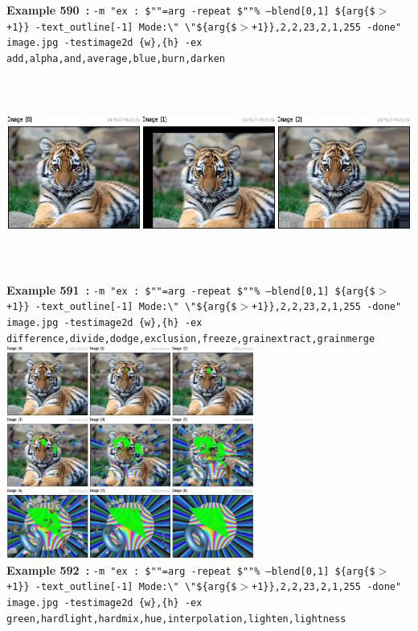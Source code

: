 \documentclass[a4paper,11pt,twoside]{book}
\begin{document}
\begin{center}
{\footnotesize \textbf{Example 590~:} \texttt{-m "ex : \$""=arg -repeat \$""\% --blend[0,1] \$\{arg\{\$$>$+1\}\} -text\_outline[-1] Mode:\textbackslash " \textbackslash "\$\{arg\{\$$>$+1\}\},2,2,23,2,1,255 -done" image.jpg -testimage2d \{w\},\{h\} -ex add,alpha,and,average,blue,burn,darken}}
\\\includegraphics[keepaspectratio=true,height=7cm,width=\textwidth]{img/gmic_def591.jpg}\\
{\footnotesize \textbf{Example 591~:} \texttt{-m "ex : \$""=arg -repeat \$""\% --blend[0,1] \$\{arg\{\$$>$+1\}\} -text\_outline[-1] Mode:\textbackslash " \textbackslash "\$\{arg\{\$$>$+1\}\},2,2,23,2,1,255 -done" image.jpg -testimage2d \{w\},\{h\} -ex difference,divide,dodge,exclusion,freeze,grainextract,grainmerge}}
\\\includegraphics[keepaspectratio=true,height=7cm,width=\textwidth]{img/gmic_def592.jpg}\\
{\footnotesize \textbf{Example 592~:} \texttt{-m "ex : \$""=arg -repeat \$""\% --blend[0,1] \$\{arg\{\$$>$+1\}\} -text\_outline[-1] Mode:\textbackslash " \textbackslash "\$\{arg\{\$$>$+1\}\},2,2,23,2,1,255 -done" image.jpg -testimage2d \{w\},\{h\} -ex green,hardlight,hardmix,hue,interpolation,lighten,lightness}}

\end{center}
\end{document}
